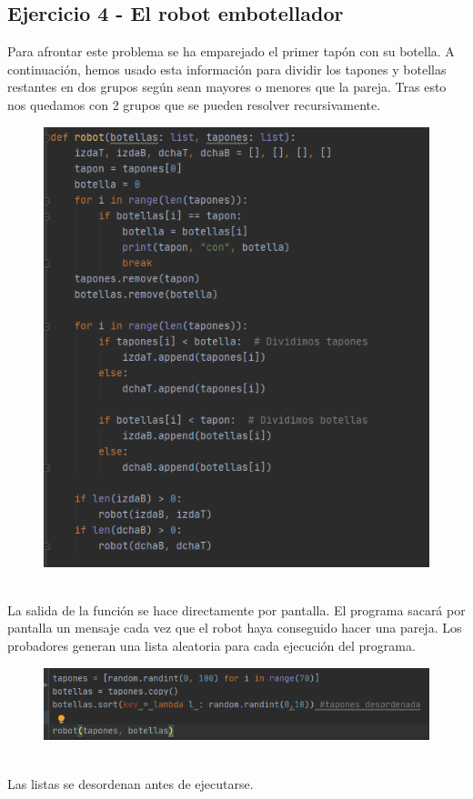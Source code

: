 \documentclass[]{report}
\begin{document}
\subsection*{Ejercicio 4 - El robot embotellador}
Para afrontar este problema se ha emparejado el primer tapón con su botella. A continuación, hemos usado esta información para dividir los tapones y botellas restantes en dos grupos según sean mayores o menores que la pareja. Tras esto nos quedamos con 2 grupos que se pueden resolver recursivamente.
\begin{figure}[h!]
	\centering
	\includegraphics[width=1\linewidth]{3}
	\caption{}
	\label{fig:3}
\end{figure}\\
La salida de la función se hace directamente por pantalla. El programa sacará por pantalla un mensaje cada vez que el robot haya conseguido hacer una pareja.
\newpage
Los probadores generan una lista aleatoria para cada ejecución del programa.
\begin{figure}[h!]
	\centering
	\includegraphics[width=1\linewidth]{4}
	\caption{}
	\label{fig:4}
\end{figure}\\
Las listas se desordenan antes de ejecutarse.
\end{document}
